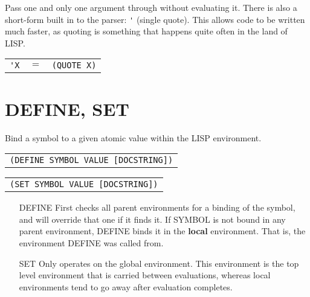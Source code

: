 \documentclass[
letterpaper,
oneside,
]{memoir}
\begin{document}
\noindent
Pass one and only one argument through without evaluating it. There is also a short-form built in to the parser: \verb|'| (single quote). This allows code to be written much faster, as quoting is something that happens quite often in the land of LISP.

\begin{center}
  \begin{tabular}{rcl}
    \verb|'X| & $=$ & \texttt{(QUOTE X)} \\
  \end{tabular}
\end{center}

\vspace{1em}

\section{DEFINE, SET}

\noindent
Bind a symbol to a given atomic value within the LISP environment.

\begin{center}
  \begin{tabular}{c}
    \texttt{(DEFINE SYMBOL VALUE [DOCSTRING])}
  \end{tabular}
\end{center}

\begin{center}
  \begin{tabular}{c}
    \texttt{(SET    SYMBOL VALUE [DOCSTRING])}
  \end{tabular}
\end{center}

\begin{itemize}
\item[DEFINE] First checks all parent environments for a binding of the
  symbol, and will override that one if it finds it. If SYMBOL is not
  bound in any parent environment, DEFINE binds it in the \textbf{local}
  environment. That is, the environment DEFINE was called from.

\item[SET] Only operates on the global environment. This environment is
  the top level environment that is carried between evaluations,
  whereas local environments tend to go away after evaluation
  completes.
\end{itemize}
\end{document}
